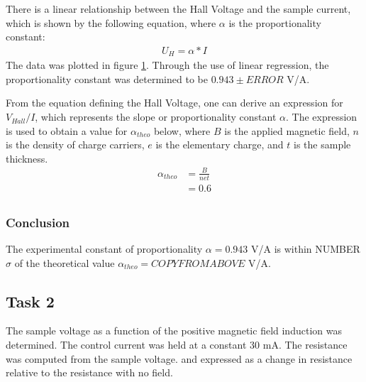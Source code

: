 \documentclass[a4paper]{article}
\begin{document}
There is a linear relationship between the Hall Voltage and the sample 
current, which is shown by the following equation, where $\alpha$ is
the proportionality constant:
\begin{align*}
U_H = \alpha * I
\end{align*}
The data was plotted in figure \ref{task21plot}. Through the use of linear regression, the proportionality constant was determined to be $0.943 \pm ERROR$ V/A. 

\begin{figure}[H]
\centering
\label{task21plot}
\end{figure}

From the equation defining the Hall Voltage, one can derive an expression for $V_{Hall}/I$, which represents the slope or proportionality constant $\alpha$. The expression is used to obtain a value for $\alpha_{theo}$ below, where $B$ is the applied magnetic field, $n$ is the density of charge carriers, $e$ is the elementary charge, and $t$ is the sample thickness.
\begin{align*}
\alpha_{theo} &= \frac{B}{net} \\
			  &= 0.6 \\
\end{align*}

\subsubsection{Conclusion}
The experimental constant of proportionality $\alpha = 0.943 $ V/A is within NUMBER $\sigma$ of the theoretical value $\alpha_{theo} = COPYFROMABOVE$ V/A.

\subsection{Task 2}

\qq The sample voltage as a function of the positive magnetic field
induction was determined. The control current was held at a constant
30 mA. The resistance was computed from the sample voltage. and expressed as a change in resistance relative to the resistance with no field.
\end{document}
